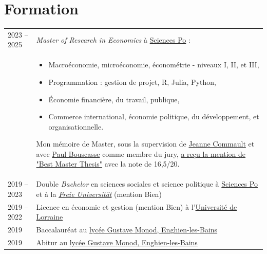 \documentclass[a4paper,12pt]{article}
\begin{document}
\section{Formation}
\begin{tabularx}{\linewidth}{@{}l X@{}}	

2023 – 2025 & \textit{Master of Research in Economics} à \href{https://www.sciencespo.fr/en/}{Sciences Po} : \\ 
& \begin{itemize}
    \item Macroéconomie, microéconomie, économétrie - niveaux I, II, et III,
    \item Programmation : gestion de projet, R, Julia, Python,
    \item Économie financière, du travail, publique,
    \item Commerce international, économie politique, du développement, et organisationnelle.
\end{itemize} 

Mon mémoire de Master, sous la supervision de \href{https://www.jcommault.com}{Jeanne Commault} et avec \href{https://www.paul-bouscasse.com}{Paul Bouscasse} comme membre du jury, \href{https://www.sciencespo.fr/ecole-recherche/en/academics/masters/master-economics/best-thesis/}{a reçu la mention de "Best Master Thesis"} avec la note de 16,5/20.
\\

2019 – 2023 & Double \textit{Bachelor} en sciences sociales et science politique à \href{https://www.sciencespo.fr/en/}{Sciences Po} et à la \textit{\href{https://www.fu-berlin.de/en/index.html}{Freie Universität}} (mention Bien)\\

2019 – 2022 & Licence en économie et gestion (mention Bien) à l'\href{https://www.univ-lorraine.fr/en/}{Université de Lorraine}\\

2019 & Baccalauréat au \href{https://www.lyc-polyvalent-monod-enghien.fr/}{lycée Gustave Monod, Enghien-les-Bains} \hfill \\

2019 & Abitur au \href{https://www.lyc-polyvalent-monod-enghien.fr/}{lycée Gustave Monod, Enghien-les-Bains} \hfill \\
\end{tabularx}

\end{document}
